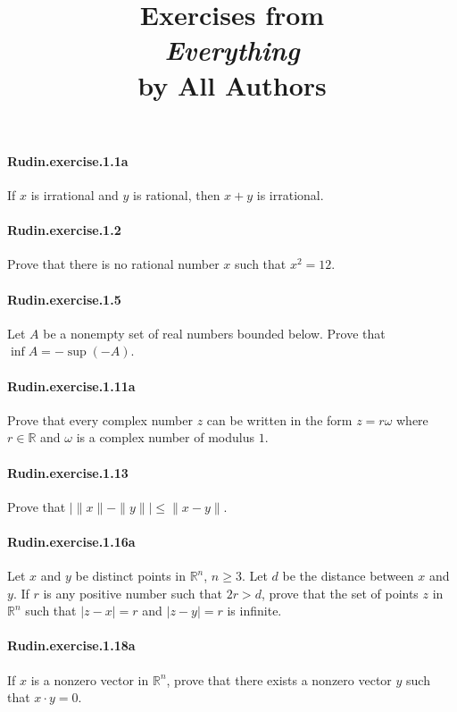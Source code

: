 \documentclass{article}
\title{\textbf{
Exercises from \\
\textit{Everything} \\
by All Authors
}}
\date{}
\begin{document}
\maketitle

\paragraph{Rudin.exercise.1.1a} If $x$ is irrational and $y$ is rational, then $x+y$ is irrational.

\paragraph{Rudin.exercise.1.2} Prove that there is no rational number $x$ such that $x^2=12$.

\paragraph{Rudin.exercise.1.5} Let $A$ be a nonempty set of real numbers bounded below. Prove that $\inf A = -\sup(-A)$.

\paragraph{Rudin.exercise.1.11a} Prove that every complex number $z$ can be written in the form $z=r\omega$ where $r\in\mathbb{R}$ and $\omega$ is a complex number of modulus $1$.

\paragraph{Rudin.exercise.1.13} Prove that $|\|x\|-\|y\||\leq \|x-y\|$.

\paragraph{Rudin.exercise.1.16a} Let $x$ and $y$ be distinct points in $\mathbb{R}^n$, $n\geq 3$. Let $d$ be the distance between $x$ and $y$. If $r$ is any positive number such that $2r>d$, prove that the set of points $z$ in $\mathbb{R}^n$ such that $|z-x|=r$ and $|z-y|=r$ is infinite.

\paragraph{Rudin.exercise.1.18a} If $x$ is a nonzero vector in $\mathbb{R}^n$, prove that there exists a nonzero vector $y$ such that $x\cdot y = 0$.
\end{document}
